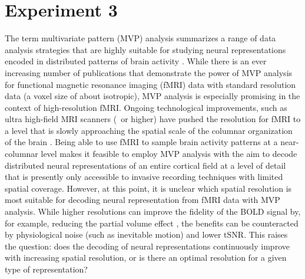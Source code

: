 
\chapter{Experiment 3}
The term multivariate pattern (MVP) analysis summarizes a range of data
analysis strategies that are highly suitable for studying neural
representations encoded in distributed patterns of brain activity
\citep{haxby_2012}. While there is an ever increasing number of publications
that demonstrate the power of MVP analysis for functional magnetic resonance
imaging (fMRI) data \citep{opdebeeck_2010,freeman_2011,alink_2013,freeman_2013}
with standard resolution data (a voxel size of about  isotropic), MVP
analysis is especially promising in the context of high-resolution fMRI.
Ongoing technological improvements, such as ultra high-field MRI scanners
(\sevenT\ or higher) have pushed the resolution for fMRI to a level
that is slowly approaching the spatial scale of the columnar organization of
the brain \citep{yacoub_2008,heidemann_2012}. Being able to use fMRI to sample
brain activity patterns at a near-columnar level makes it feasible to employ
MVP analysis with the aim to decode distributed neural representations of an
entire cortical field at a level of detail that is presently only accessible to
invasive recording techniques with limited spatial coverage. However, at this
point, it is unclear which spatial resolution is most suitable for decoding
neural representation from fMRI data with MVP analysis. While higher
resolutions can improve the fidelity of the BOLD signal by, for example,
reducing the partial volume effect \citep{Weibull_2008}, the benefits can be
counteracted by physiological noise (such as inevitable motion) and lower tSNR. 
This raises the question: does the decoding of neural representations continuously improve
with increasing spatial resolution, or is there an optimal resolution for a
given type of representation?


